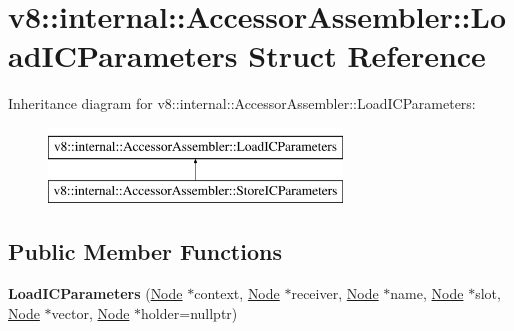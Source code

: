 \hypertarget{structv8_1_1internal_1_1AccessorAssembler_1_1LoadICParameters}{}\section{v8\+:\+:internal\+:\+:Accessor\+Assembler\+:\+:Load\+I\+C\+Parameters Struct Reference}
\label{structv8_1_1internal_1_1AccessorAssembler_1_1LoadICParameters}
Inheritance diagram for v8\+:\+:internal\+:\+:Accessor\+Assembler\+:\+:Load\+I\+C\+Parameters\+:\begin{figure}[H]
\begin{center}
\leavevmode
\includegraphics[height=2.000000cm]{structv8_1_1internal_1_1AccessorAssembler_1_1LoadICParameters}
\end{center}
\end{figure}
\subsection*{Public Member Functions}
\begin{DoxyCompactItemize}
\item 
\mbox{\label{structv8_1_1internal_1_1AccessorAssembler_1_1LoadICParameters_a7a76b396a77605847f9ce3537c5f3d47}} 
{\bfseries Load\+I\+C\+Parameters} (\mbox{\hyperlink{classv8_1_1internal_1_1compiler_1_1Node}{Node}} $\ast$context, \mbox{\hyperlink{classv8_1_1internal_1_1compiler_1_1Node}{Node}} $\ast$receiver, \mbox{\hyperlink{classv8_1_1internal_1_1compiler_1_1Node}{Node}} $\ast$name, \mbox{\hyperlink{classv8_1_1internal_1_1compiler_1_1Node}{Node}} $\ast$slot, \mbox{\hyperlink{classv8_1_1internal_1_1compiler_1_1Node}{Node}} $\ast$vector, \mbox{\hyperlink{classv8_1_1internal_1_1compiler_1_1Node}{Node}} $\ast$holder=nullptr)
\end{DoxyCompactItemize}

